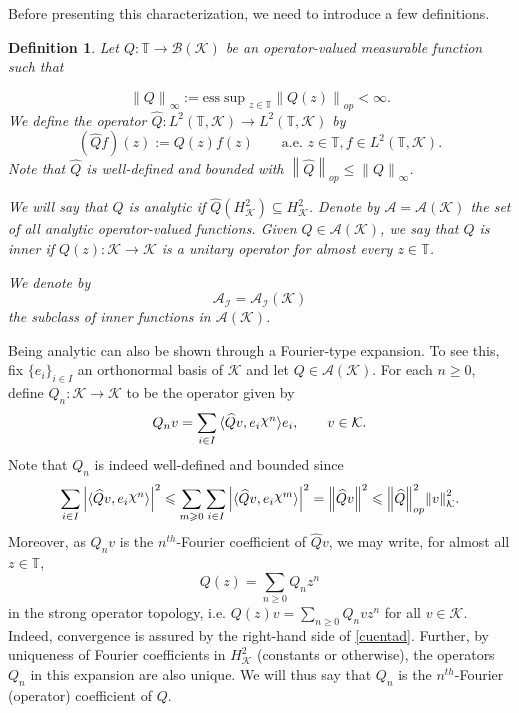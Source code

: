 \documentclass[a4paper,12pt]{amsart}
\def\cA{{\mathcal{A}}}
\def\cB{{\mathcal{B}}}
\def\cI{{\mathcal{I}}}
\def\KK{{\mathcal{K}}}
\def\T{{\mathbb{T}}}
\def\esssup{{\mathrm{ess}\sup}}
\DeclareRobustCommand{\rchi}{{\mathpalette\irchi\relax}}
\newcommand{\irchi}[2]{\raisebox{\depth}{$#1\chi$}} %
\newcommand{\norm}[1]{{\left\|{#1}\right\|}}
\newcommand{\abs}[1]{{\left|{#1}\right|}}
\newcommand{\scal}[1]{{\langle{#1}\rangle}}
\newtheorem{definition}[theorem]{Definition}
\theoremstyle{definition}
\begin{document}
Before presenting this characterization, we need to introduce a few definitions.
\begin{definition}\label{inner}
Let $Q:\T\rightarrow\cB(\KK)$ be an operator-valued measurable function such that 


\begin{equation*}
\norm{Q}_\infty:=\esssup_{z\in\T}\norm{Q(z)}_{op}<\infty.
\end{equation*}
We define the operator $\widehat{Q}:L^2(\T,\KK)\rightarrow L^2(\T,\KK)$ by
\begin{equation*}
(\widehat{Q}f)(z):=Q(z)f(z)\qquad\text{a.e. }z\in\T,f\in L^2(\T,\KK).
\end{equation*}
Note that $\widehat{Q}$ is well-defined and bounded with $\norm{\widehat{Q}}_{op}\leqslant\norm{Q}_\infty$.




We will say that $Q$ is {\em analytic} if $\widehat{Q}(H^2_\KK)\subseteq H^2_\KK$. Denote by $\cA=\cA(\KK)$ the set of all {\em analytic} operator-valued functions. 
Given $Q\in\cA(\KK)$, we say that $Q$ is  inner if $Q(z):\KK\to\KK$ is a unitary operator for almost every $z\in\T$.

We denote by $$\cA_\cI=\cA_\cI(\KK)$$  the subclass of inner functions in $\cA(\KK)$.
\end{definition}
Being analytic can also be shown through a Fourier-type expansion. To see this, fix $\{e_i\}_{i\in I}$ an orthonormal basis of $\KK$ and let $Q\in\cA(\KK)$. For each $n\geqslant0$, define $Q_n:\KK\to\KK$ to be the operator given by
\begin{equation*}
Q_nv=\sum_{i\in I}\scal{\widehat{Q}v,e_i\rchi^n}e_i,\qquad v\in\KK.
\end{equation*}
Note that $Q_n$ is indeed well-defined and bounded since
\begin{equation}\label{cuentad}
\sum_{i\in I}\abs{\scal{\widehat{Q}v,e_i\rchi^n}}^2\leqslant\sum_{m\geqslant0}\sum_{i\in I}\abs{\scal{\widehat{Q}v,e_i\rchi^m}}^2=\norm{\widehat{Q}v}^2\leqslant\norm{\widehat{Q}}_{op}^2\norm{v}^2_\KK.
\end{equation}
Moreover, as $Q_nv$ is the $n^{th}$-Fourier coefficient of $\widehat{Q}v$, we may write, for almost all $z\in\T$,
\begin{equation}\label{eq:fourier_Q}
Q(z)=\sum_{n\geqslant0}Q_nz^n
\end{equation}
in the strong operator topology, i.e. $Q(z)v=\sum_{n\geqslant0}Q_nvz^n$ for all $v\in\KK$. Indeed, convergence is assured by the right-hand side of \eqref{cuentad}. Further, by uniqueness of Fourier coefficients in $H^2_\KK$ (constants or otherwise), the operators $Q_n$ in this expansion are also unique. We will thus say that $Q_n$ is the $n^{th}$-Fourier (operator) coefficient of $Q$.
\end{document}
